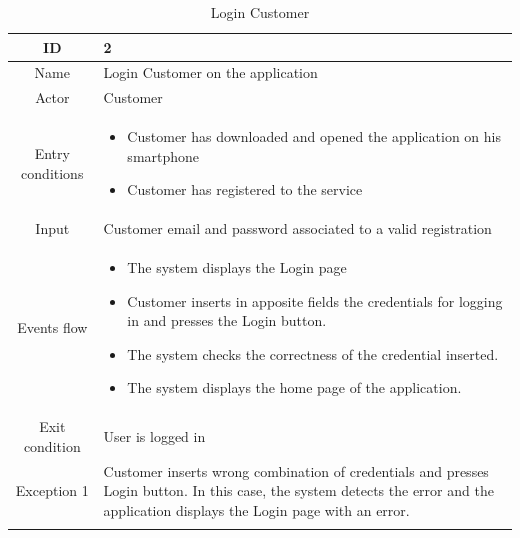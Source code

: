\begin{longtable}{|c| p{10cm}|}
    \hline ID        & 2 \\
    \hline
    Name             & Login Customer on the application\\
    \hline
    Actor            & Customer \\
    \hline
    Entry conditions & \begin{itemize}[nosep,after=\strut]
        \item Customer has downloaded and opened the application on his smartphone
        \item Customer has registered to the service
    \end{itemize}\\ \hline
    Input            & Customer email and password associated to a valid registration \\
    \hline
    Events flow      & \begin{itemize}[nosep,after=\strut]
        \item The system displays the Login page
        \item Customer inserts in apposite fields the credentials for logging in and presses the Login button.
        \item The system checks the correctness of the credential inserted.
        \item The system displays the home page of the application.
    \end{itemize} \\
    \hline
    Exit condition   & User is logged in \\
    \hline
    \hline
    Exception 1      & Customer inserts wrong combination of credentials and presses Login button. In this case, the system detects the error and the application displays the Login page with an error. \\
    \hline
    \caption{Login Customer} \\
\end{longtable}
